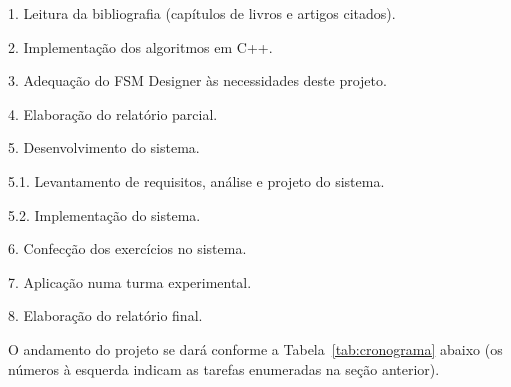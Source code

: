 \documentclass[
	12pt,				%
	openany,
	oneside,
	a4paper,			%
	english,			%
	brazil,				%
	]{abntex2}
\begin{document}
\begin{alineas}

	\item[1.] Leitura da bibliografia (capítulos de livros e artigos citados).
	\item[2.] Implementação dos algoritmos em C++.
	\item[3.] Adequação do FSM Designer às necessidades deste projeto.
	\item[4.] Elaboração do relatório parcial.
    \item[5.] Desenvolvimento do sistema.
	\begin{alineas}
		\item[5.1.] Levantamento de requisitos, análise e projeto do sistema.
		\item[5.2.] Implementação do sistema.
	\end{alineas}
	\item[6.] Confecção dos exercícios no sistema.
	\item[7.] Aplicação numa turma experimental.
	\item[8.] Elaboração do relatório final.
\end{alineas}


O andamento do projeto se dará conforme a Tabela~\ref{tab:cronograma} abaixo (os números à esquerda indicam as tarefas enumeradas na seção anterior). 
\end{document}

